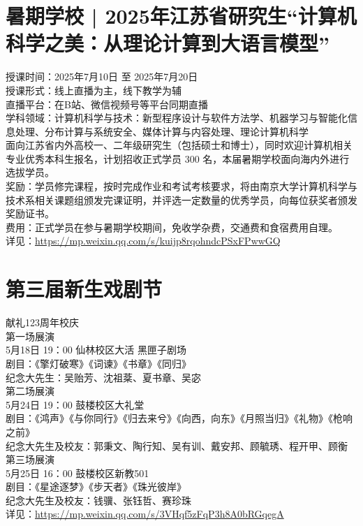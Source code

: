 \documentclass[letterpaper, 12pt]{article}
\begin{document}
\begin{multicols}{2}
\section{暑期学校 | 2025年江苏省研究生“计算机科学之美：从理论计算到大语言模型”} %
授课时间：2025年7月10日 至 2025年7月20日
\\授课形式：线上直播为主，线下教学为辅
\\直播平台：在B站、微信视频号等平台同期直播
\\学科领域：计算机科学与技术：新型程序设计与软件方法学、机器学习与智能化信息处理、分布计算与系统安全、媒体计算与内容处理、理论计算机科学
\\面向江苏省内外高校一、二年级研究生（包括硕士和博士），同时欢迎计算机相关专业优秀本科生报名，计划招收正式学员 300 名，本届暑期学校面向海内外进行选拔学员。
\\奖励：学员修完课程，按时完成作业和考试考核要求，将由南京大学计算机科学与技术系相关课题组颁发完课证明，并评选一定数量的优秀学员，向每位获奖者颁发奖励证书。 
\\费用：正式学员在参与暑期学校期间，免收学杂费，交通费和食宿费用自理。
\\详见：\url{https://mp.weixin.qq.com/s/kuijp8rqohndcPSxFPwwGQ}

\section{第三届新生戏剧节} %
献礼123周年校庆
\\第一场展演
\\5月18日 19：00 仙林校区大活 黑匣子剧场
\\剧目：《擎灯破寒》《词谏》《书章》《同归》
\\纪念大先生：吴贻芳、沈祖棻、夏书章、吴宓
\\第二场展演
\\5月24日 19：00 鼓楼校区大礼堂
\\剧目：《鸿声》《与你同行》《归去来兮》《向西，向东》《月照当归》《礼物》《枪响之前》
\\纪念大先生及校友：郭秉文、陶行知、吴有训、戴安邦、顾毓琇、程开甲、顾衡
\\第三场展演
\\5月25日 16：00 鼓楼校区新教501
\\剧目：《星途逐梦》《步天者》《珠光彼岸》
\\纪念大先生及校友：钱骥、张钰哲、赛珍珠
\\详见：\url{https://mp.weixin.qq.com/s/3VHqf5zFqP3h8A0bRGqegA}



\end{multicols}
\end{document}
